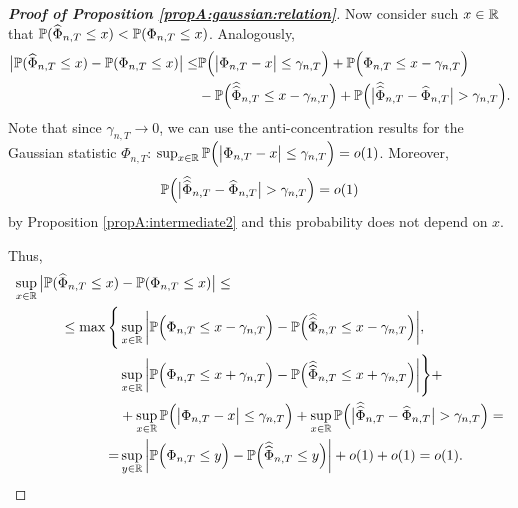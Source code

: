 \documentclass[a4paper,12pt]{article}
\makeatletter
\renewcommand{\eqref}[1]{\tagform@{\ref{#1}}}
\newcommand{\doublehattwo}[1]{\widehat{\widehat{#1}}}
\makeatother
\begin{document}
\begin{proof}[\textnormal{\textbf{Proof of Proposition \ref{propA:gaussian:relation}}}]
Now consider such $x\in \mathbb{R}$ that $\mathbb{P}(\widehat{\Phi}_{n,T}\le x) < \mathbb{P}(\Phi_{n, T}\le x)$. Analogously, 
\begin{align*}
\big| \pr(\widehat{\Phi}_{n, T} \le x) - \pr(\Phi_{n,T} \le x) \big| \le &\pr\Big(\big|\Phi_{n,T} - x \big| \le \gamma_{n, T}\Big) +\pr\Big(\Phi_{n,T} \le x - \gamma_{n, T}\Big)\\
& -\pr\Big(\doublehattwo{\Phi}_{n,T} \le x - \gamma_{n, T}\Big) +  \pr \Big(\big|\doublehattwo{\Phi}_{n,T} - \widehat{\Phi}_{n,T}\big| > \gamma_{n, T} \Big).  
\end{align*}
Note that since $\gamma_{n,T} \to 0$, we can use the anti-concentration results \eqref{eqA:anticon} for the Gaussian statistic $\Phi_{n,T}$: $\sup_{x\in \mathbb{R}}\mathbb{P}\Big(\big|\Phi_{n,T} - x \big| \le \gamma_{n, T}\Big) = o(1)$. Moreover, $$\pr \Big(\big|\doublehattwo{\Phi}_{n,T} - \widehat{\Phi}_{n,T}\big| > \gamma_{n, T} \Big) = o(1)$$ by Proposition \ref{propA:intermediate2} and this probability does not depend on $x$.

Thus, 
\begin{align*}
\sup_{x \in \reals} \big| \pr(\widehat{\Phi}_{n, T} \le x) &- \pr(\Phi_{n,T} \le x) \big| \le \\
\le \max \Bigg\{ &\sup_{x \in \reals} \bigg| \pr\Big(\Phi_{n,T} \le x - \gamma_{n, T}\Big) -\pr\Big(\doublehattwo{\Phi}_{n,T} \le x - \gamma_{n, T}\Big)\bigg|, \\
&\sup_{x \in \reals} \bigg| \pr\Big(\Phi_{n,T} \le x + \gamma_{n, T}\Big) -\pr\Big(\doublehattwo{\Phi}_{n,T} \le x + \gamma_{n, T}\Big)\bigg| \Bigg\} + \\
&+\sup_{x\in \reals}\pr\Big(\big|\Phi_{n,T} - x \big| \le \gamma_{n, T}\Big) + \sup_{x\in\reals}\pr \Big(\big|\doublehattwo{\Phi}_{n,T} - \widehat{\Phi}_{n,T}\big| > \gamma_{n, T} \Big) = \\
=&\sup_{y \in \reals} \bigg| \pr\Big(\Phi_{n,T} \le y\Big) -\pr\Big(\doublehattwo{\Phi}_{n,T} \le y\Big)\bigg| + o(1) + o(1) = o(1).
\end{align*}
\end{proof}
\end{document}
